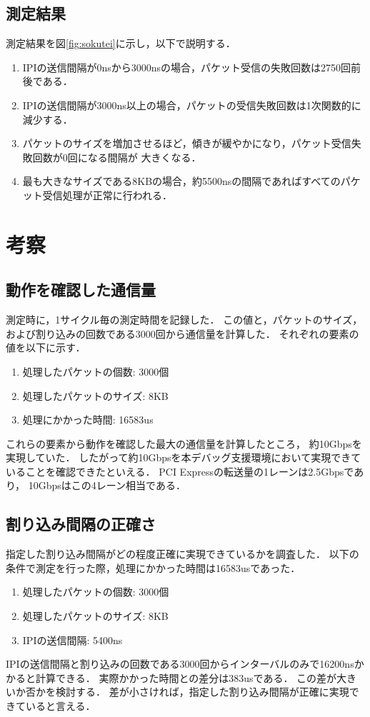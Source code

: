 \documentclass[12pt]{jsarticle}
\begin{document}
\subsection{測定結果}
測定結果を図\ref{fig:sokutei}に示し，以下で説明する．
\begin{enumerate}
    \item IPIの送信間隔が0nsから3000nsの場合，パケット受信の失敗回数は2750回前後である．
    \item IPIの送信間隔が3000ns以上の場合，パケットの受信失敗回数は1次関数的に減少する．
    \item パケットのサイズを増加させるほど，傾きが緩やかになり，パケット受信失敗回数が0回になる間隔が
        大きくなる．
    \item 最も大きなサイズである8KBの場合，約5500nsの間隔であればすべてのパケット受信処理が正常に行われる．
\end{enumerate}

\section{考察}
\subsection{動作を確認した通信量}
測定時に，1サイクル毎の測定時間を記録した．
この値と，パケットのサイズ，および割り込みの回数である3000回から通信量を計算した．
それぞれの要素の値を以下に示す．
\begin{enumerate}
    \item 処理したパケットの個数:   3000個
    \item 処理したパケットのサイズ: 8KB
    \item 処理にかかった時間:       16583us
\end{enumerate}
これらの要素から動作を確認した最大の通信量を計算したところ，
約10Gbpsを実現していた．
したがって約10Gbpsを本デバッグ支援環境において実現できていることを確認できたといえる．
PCI Expressの転送量の1レーンは2.5Gbpsであり，
10Gbpsはこの4レーン相当である．
\subsection{割り込み間隔の正確さ}
指定した割り込み間隔がどの程度正確に実現できているかを調査した．
以下の条件で測定を行った際，処理にかかった時間は16583usであった．
\begin{enumerate}
    \item 処理したパケットの個数:  3000個
    \item 処理したパケットのサイズ:  8KB
    \item IPIの送信間隔:  5400ns
\end{enumerate}
IPIの送信間隔と割り込みの回数である3000回からインターバルのみで16200nsかかると計算できる．
実際かかった時間との差分は383usである．
この差が大きいか否かを検討する．
差が小さければ，指定した割り込み間隔が正確に実現できていると言える．
\end{document}
